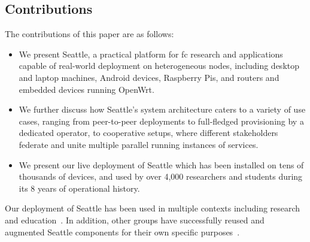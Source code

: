 \subsection{Contributions}

The contributions of this paper are as follows:
\begin{itemize}
\item We present Seattle, a practical platform for \gls{fc} research
and applications
capable of real-world deployment on heterogeneous nodes,
including desktop and laptop machines, Android devices,
Raspberry Pis,
and routers and embedded devices running OpenWrt.
\item We further discuss how
Seattle's system architecture caters to a variety of use cases,
ranging from peer-to-peer deployments to full-fledged
provisioning by a dedicated operator, to cooperative setups,
where different stakeholders federate and unite multiple parallel running
instances of services.
\item We present our live deployment of Seattle which has been
installed on tens of thousands of devices, and used by over 4,000
researchers and students during its 8 years of operational history.
\end{itemize}
Our deployment of Seattle has been used in multiple contexts
including research~\cite{li2015fence,rafetseder2013sensorium,zhuang2014sensibility,Eisl1010:Service,Tuts1010:Sustained,collares2011smart,zhuang2015privacy,cappos2014blursense,7133607} and education~\cite{Wallace_CCSC_2011,Cappos_CCSCCP_2010,Cappos_CCSCNW_2009,Cappos_SIGCSE_2014,Hooshangi_SIGCSE_2015}.
In addition, other groups have successfully reused and augmented Seattle components
for their own specific purposes~\cite{chard2010social,chard12ssc,caton2014social,muller2014tomato,tomato,eittenberger2012doubtless,zhuang2012distributed,zhuang2014taking,tredger2013building}.
